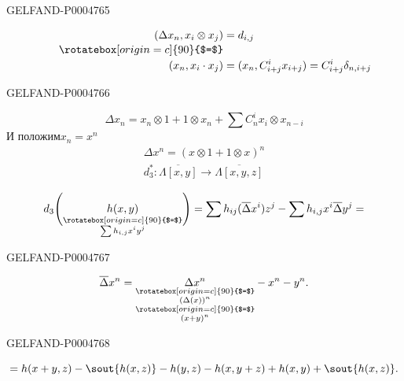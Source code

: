 \begin{GelfandAdjacentEvidence}{GELFAND-P000476}{5}


\[
\begin{aligned}
(\Delta x_n,x_i\otimes x_j)&=d_{i,j}\\[-.4ex]
\qquad\rotatebox[origin=c]{90}{$=$}&\\[-.4ex]
(x_n,x_i\cdot x_j)&=(x_n,C_{i+j}^{i}x_{i+j})=C_{i+j}^{i}\delta_{n,i+j}
\end{aligned}
\]
\end{GelfandAdjacentEvidence}
\begin{GelfandAdjacentEvidence}{GELFAND-P000476}{6}


\[
\Delta x_n=x_n\otimes1+1\otimes x_n+\sum C_n^i x_i\otimes x_{n-i}
\]
И положим\quad $x_n=x^n$
\[
\begin{gathered}
\Delta x^n=(x\otimes1+1\otimes x)^n\\
d_3^*\colon \overline{\Lambda[x,y]}\longrightarrow\overline{\Lambda[x,y,z]}
\end{gathered}
\]

\[
d_3\Biggl(\underset{
  \substack{\rotatebox[origin=c]{90}{$=$}\\ \sum h_{i,j}x^iy^j}
}{h(x,y)}\Biggr)=\sum h_{ij}(\overline\Delta x^i)z^j
-\sum h_{i,j}x^i\overline\Delta y^j=
\]
\end{GelfandAdjacentEvidence}
\begin{GelfandAdjacentEvidence}{GELFAND-P000476}{7}


\[
\overline\Delta x^n=
\underset{\substack{
 \rotatebox[origin=c]{90}{$=$}\\
 (\Delta(x))^n\\
 \rotatebox[origin=c]{90}{$=$}\\
 (x+y)^n
}}{\Delta x^n}-x^n-y^n.
\]
\end{GelfandAdjacentEvidence}
\begin{GelfandAdjacentEvidence}{GELFAND-P000476}{8}


\[
=h(x+y,z)-\mbox{\sout{\ensuremath{h(x,z)}}}-h(y,z)
-h(x,y+z)+h(x,y)+\mbox{\sout{\ensuremath{h(x,z)}}}.
\]
\end{GelfandAdjacentEvidence}
